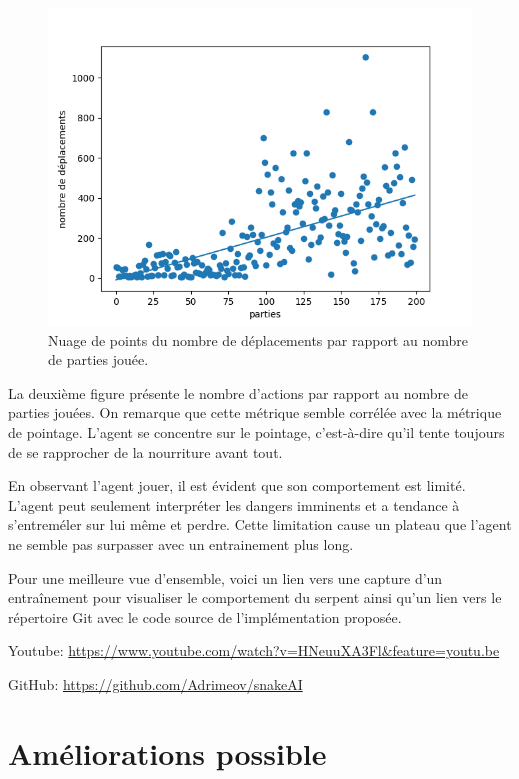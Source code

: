 \documentclass{article}
\begin{document}
\begin{figure}[ht]
	\includegraphics[width=\linewidth]{moves_per_game_200.png}
	\caption{Nuage de points du nombre de déplacements par rapport au nombre de parties jouée.}
	\label{fig:Snake}
\end{figure}

La deuxième figure présente le nombre d'actions par rapport au nombre de parties jouées. On remarque que cette métrique semble corrélée avec la métrique de pointage. L'agent se concentre sur le pointage, c'est-à-dire qu'il tente toujours de se rapprocher de la nourriture avant tout.

En observant l'agent jouer, il est évident que son comportement est limité. L'agent peut seulement interpréter les dangers imminents et a tendance à s'entreméler sur lui même et perdre. Cette limitation cause un plateau que l'agent ne semble pas surpasser avec un entrainement plus long.


Pour une meilleure vue d'ensemble, voici un lien vers une capture d’un entraînement pour visualiser le comportement du serpent ainsi qu'un lien vers le répertoire Git avec le code source de l'implémentation proposée.

Youtube: 
\href{https://www.youtube.com/watch?v=HNeuuXA3Flg&feature=youtu.be}{https://www.youtube.com/watch?v=HNeuuXA3Fl\&feature=youtu.be}

GitHub: 
\href{https://github.com/Adrimeov/snakeAI}{https://github.com/Adrimeov/snakeAI}


\section{Améliorations possible}
\end{document}
